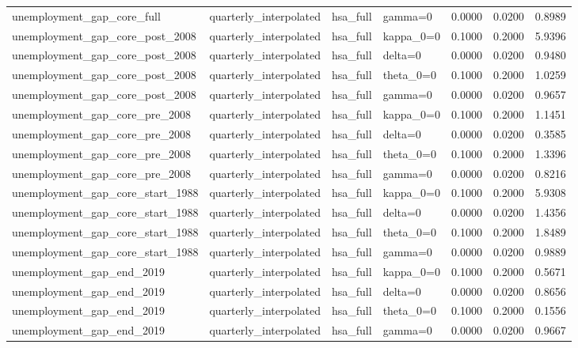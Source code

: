 \begin{tabular}{llllrrr}
unemployment\_gap\_core\_full & quarterly\_interpolated & hsa\_full & gamma=0 & 0.0000 & 0.0200 & 0.8989 \\
unemployment\_gap\_core\_post\_2008 & quarterly\_interpolated & hsa\_full & kappa\_0=0 & 0.1000 & 0.2000 & 5.9396 \\
unemployment\_gap\_core\_post\_2008 & quarterly\_interpolated & hsa\_full & delta=0 & 0.0000 & 0.0200 & 0.9480 \\
unemployment\_gap\_core\_post\_2008 & quarterly\_interpolated & hsa\_full & theta\_0=0 & 0.1000 & 0.2000 & 1.0259 \\
unemployment\_gap\_core\_post\_2008 & quarterly\_interpolated & hsa\_full & gamma=0 & 0.0000 & 0.0200 & 0.9657 \\
unemployment\_gap\_core\_pre\_2008 & quarterly\_interpolated & hsa\_full & kappa\_0=0 & 0.1000 & 0.2000 & 1.1451 \\
unemployment\_gap\_core\_pre\_2008 & quarterly\_interpolated & hsa\_full & delta=0 & 0.0000 & 0.0200 & 0.3585 \\
unemployment\_gap\_core\_pre\_2008 & quarterly\_interpolated & hsa\_full & theta\_0=0 & 0.1000 & 0.2000 & 1.3396 \\
unemployment\_gap\_core\_pre\_2008 & quarterly\_interpolated & hsa\_full & gamma=0 & 0.0000 & 0.0200 & 0.8216 \\
unemployment\_gap\_core\_start\_1988 & quarterly\_interpolated & hsa\_full & kappa\_0=0 & 0.1000 & 0.2000 & 5.9308 \\
unemployment\_gap\_core\_start\_1988 & quarterly\_interpolated & hsa\_full & delta=0 & 0.0000 & 0.0200 & 1.4356 \\
unemployment\_gap\_core\_start\_1988 & quarterly\_interpolated & hsa\_full & theta\_0=0 & 0.1000 & 0.2000 & 1.8489 \\
unemployment\_gap\_core\_start\_1988 & quarterly\_interpolated & hsa\_full & gamma=0 & 0.0000 & 0.0200 & 0.9889 \\
unemployment\_gap\_end\_2019 & quarterly\_interpolated & hsa\_full & kappa\_0=0 & 0.1000 & 0.2000 & 0.5671 \\
unemployment\_gap\_end\_2019 & quarterly\_interpolated & hsa\_full & delta=0 & 0.0000 & 0.0200 & 0.8656 \\
unemployment\_gap\_end\_2019 & quarterly\_interpolated & hsa\_full & theta\_0=0 & 0.1000 & 0.2000 & 0.1556 \\
unemployment\_gap\_end\_2019 & quarterly\_interpolated & hsa\_full & gamma=0 & 0.0000 & 0.0200 & 0.9667 \\

\end{tabular}
